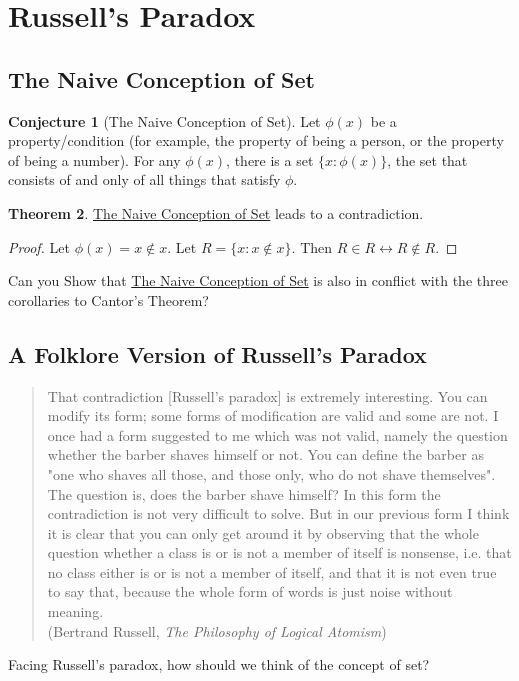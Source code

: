 \documentclass[11pt]{article}
\theoremstyle{definition}
\newtheorem{theorem}{Theorem}[section]
\newtheorem{conj}[theorem]{Conjecture}
\begin{document}
\section{Russell's Paradox}

\subsection{The Naive Conception of Set}

\begin{conj} [The Naive Conception of Set] \label{Naive}
Let $\phi (x)$ be a property/condition (for example, the property of being a person, or the property of being a number). For any $\phi(x)$, there is a set $\{ x: \phi(x) \}$, the set that consists of and only of all things that satisfy $\phi$.
\end{conj}

\begin{theorem}
\hyperref [Naive] {The Naive Conception of Set} leads to a contradiction.
\end{theorem}

\begin{proof}
Let $\phi(x) = x \notin x$. Let $R=\{x:x \notin x\}$. Then $R \in R \leftrightarrow R \notin R$.
\end{proof}

Can you Show that \hyperref [Naive] {The Naive Conception of Set} is also in conflict with the three corollaries to Cantor's Theorem?

\subsection{A Folklore Version of Russell's Paradox}

\begin{quote}
That contradiction [Russell's paradox] is extremely interesting. You can modify its form; some forms of modification are valid and some are not. I once had a form suggested to me which was not valid, namely the question whether the barber shaves himself or not. You can define the barber as "one who shaves all those, and those only, who do not shave themselves". The question is, does the barber shave himself? In this form the contradiction is not very difficult to solve. But in our previous form I think it is clear that you can only get around it by observing that the whole question whether a class is or is not a member of itself is nonsense, i.e. that no class either is or is not a member of itself, and that it is not even true to say that, because the whole form of words is just noise without meaning. \\

\hfill (Bertrand Russell, \textit{The Philosophy of Logical Atomism})
\end{quote}

\hfill

Facing Russell's paradox, how should we think of the concept of set?
\end{document}

